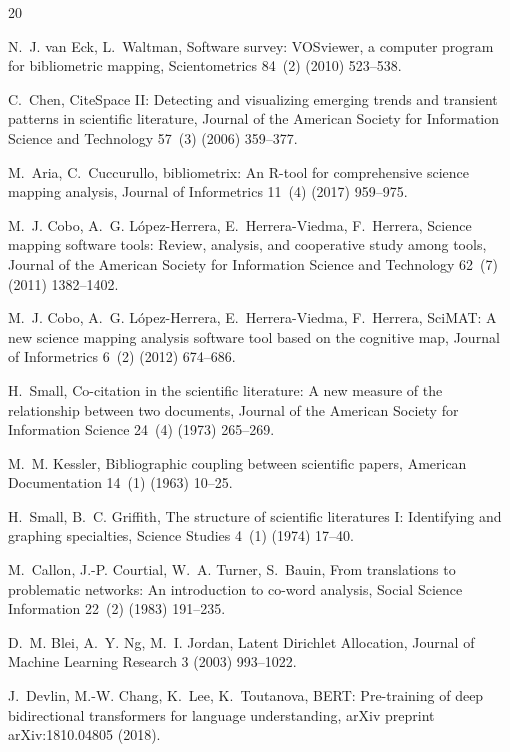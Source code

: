 \documentclass[preprint,12pt]{elsarticle}
\begin{document}

\begin{thebibliography}{20}

N.~J. van Eck, L.~Waltman, Software survey: VOSviewer, a computer program for bibliometric mapping, Scientometrics 84~(2) (2010) 523--538.

C.~Chen, CiteSpace II: Detecting and visualizing emerging trends and transient patterns in scientific literature, Journal of the American Society for Information Science and Technology 57~(3) (2006) 359--377.

M.~Aria, C.~Cuccurullo, bibliometrix: An R-tool for comprehensive science mapping analysis, Journal of Informetrics 11~(4) (2017) 959--975.

M.~J. Cobo, A.~G. L{\'o}pez-Herrera, E.~Herrera-Viedma, F.~Herrera, Science mapping software tools: Review, analysis, and cooperative study among tools, Journal of the American Society for Information Science and Technology 62~(7) (2011) 1382--1402.

M.~J. Cobo, A.~G. L{\'o}pez-Herrera, E.~Herrera-Viedma, F.~Herrera, SciMAT: A new science mapping analysis software tool based on the cognitive map, Journal of Informetrics 6~(2) (2012) 674--686.

H.~Small, Co-citation in the scientific literature: A new measure of the relationship between two documents, Journal of the American Society for Information Science 24~(4) (1973) 265--269.

M.~M. Kessler, Bibliographic coupling between scientific papers, American Documentation 14~(1) (1963) 10--25.

H.~Small, B.~C. Griffith, The structure of scientific literatures I: Identifying and graphing specialties, Science Studies 4~(1) (1974) 17--40.

M.~Callon, J.-P. Courtial, W.~A. Turner, S.~Bauin, From translations to problematic networks: An introduction to co-word analysis, Social Science Information 22~(2) (1983) 191--235.

D.~M. Blei, A.~Y. Ng, M.~I. Jordan, Latent Dirichlet Allocation, Journal of Machine Learning Research 3 (2003) 993--1022.

J.~Devlin, M.-W. Chang, K.~Lee, K.~Toutanova, BERT: Pre-training of deep bidirectional transformers for language understanding, arXiv preprint arXiv:1810.04805 (2018).


\end{thebibliography}
\end{document}
